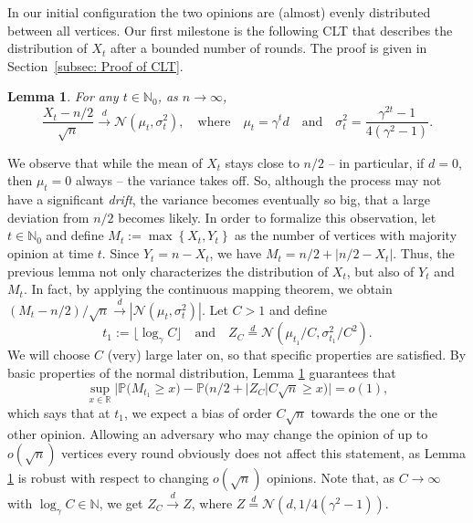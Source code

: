 \documentclass[11pt]{article}
\newcommand{\Prob}{\mathbb{P}}
\numberwithin{theorem}{section}
\newtheorem{lemma}[theorem]{Lemma}
\begin{document}
\medskip
\noindent
In our initial configuration the two opinions are (almost) evenly distributed between all vertices. Our first milestone is the following CLT that describes the distribution of $X_t$ after a bounded number of rounds. The proof is given in Section~\ref{subsec: Proof of CLT}.
\begin{lemma}\label{lem: CLT}
    For any $t \in \mathbb{N}_0$, as $n \to \infty$,
    \[
    \frac{X_t-n/2}{\sqrt{n}} \stackrel{d}{\to} \mathcal{N}\left(\mu_t, \sigma_t^2 \right), 
    \quad 
    \text{where} 
    \quad 
    \mu_t = \gamma^t d
    \quad
    \text{and}
    \quad
    \sigma_t^2 = \frac{\gamma^{2t}-1}{4\left(\gamma^2-1\right)}.
    \]
\end{lemma}
\noindent
We observe that while the mean of $X_t$ stays close to $n/2$ -- in particular, if $d=0$, then $\mu_t = 0$ always -- the variance takes off. So, although the process may not have a significant \emph{drift}, the variance becomes eventually so big, that a large deviation from $n/2$ becomes likely. In order to formalize this observation,
let $t \in \mathbb{N}_0$ and define $M_t := \max\left \{X_t,Y_t\right\}$ as the number of vertices with majority opinion at time $t$. Since $Y_t = n- X_t$, we have $M_t = n/2 +|n/2-X_t|$. Thus, the previous lemma not only characterizes the distribution of $X_t$, but also of $Y_t$ and $M_t$. In fact, by applying the continuous mapping theorem, we obtain 
$(M_t-n/2)/\sqrt{n}\stackrel{d}{\to} |\mathcal{N}\left(\mu_t, \sigma_t^2 \right)|$. Let $C>1$ and define
\begin{equation}
\label{eq:t1}
    t_1 := \lfloor \log_\gamma C\rfloor
    \quad
    \text{and}
    \quad
    Z_{C} \stackrel{d}{=} \mathcal{N}(\mu_{t_1}/C,\sigma_{t_1}^2/C^2).
\end{equation}
We will choose $C$ (very) large later on, so that specific properties are satisfied.
By basic properties of the normal distribution, Lemma \ref{lem: CLT} guarantees that
\begin{equation}
\label{eq:cltM}    
    \sup_{x\in\mathbb{R}}\big|\Prob(M_{t_1}\geq x\big) - \Prob\big(n/2+|Z_C|C\sqrt{n}\geq x\big)\big| = o(1),
\end{equation}
which says that at $t_1$, we expect a bias of order $C\sqrt{n}$ towards the one or the other opinion. 
Allowing an adversary who may change the opinion of up to $o(\sqrt{n})$ vertices every round obviously does not affect this statement, as Lemma \ref{lem: CLT} is robust with respect to changing $o(\sqrt{n})$ opinions.
Note that, as $C \to \infty$ with $\log_\gamma C\in \mathbb{N}$, we get $Z_C \stackrel{d}{\to} Z$, where $Z\stackrel{d}{=}\mathcal{N}(d,1/4(\gamma^2-1))$.
\end{document}
